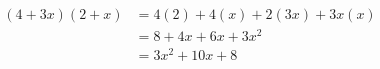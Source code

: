 \documentclass[preview]{standalone}
\begin{document}
\begin{center}
\begin{align*}(4+3x)(2+x) &= 4(2) + 4(x) + 2(3x) + 3x(x) \\ &= 8 + 4x + 6x + 3x^2 \\ &= 3x^2 + 10x + 8\end{align*}
\end{center}
\end{document}
